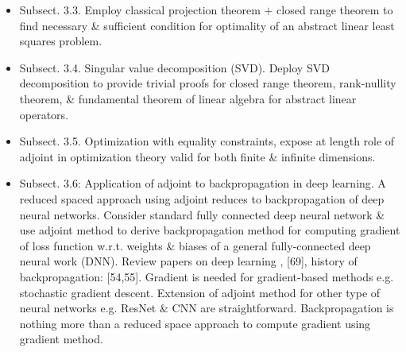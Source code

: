 \documentclass{article}
\newtheorem{proposition}{Proposition}
\newtheorem{theorem}{Theorem}
\begin{document}
\begin{enumerate}
\begin{itemize}
\begin{itemize}
			\begin{proposition}
				Let $A:X\to X$ be a linear operator. Then $A$ has at least 1 eigenvalue.
			\end{proposition}

			\begin{theorem}
				Let $A:X\to X$ be a self-adjoint linear operator. Then, an orthonormal basis of $X$ can be constructed from eigenfunctions of $A$.
			\end{theorem}

			\begin{theorem}[Spectral decomposition of self-adjoint operators in finite dimensions]
				Let $\dim X = n$ \& $A:X\to X$ be a linear \& self-adjoint operator. There exists $n$ real values $\lambda_1\ge\lambda_2\ge\cdots\ge\lambda_n$ \& orthonormal vectors $u_1,u_2,\ldots,u_n$ s.t. $Au_i = \lambda_iu_i$. $\forall x\in X$, $Ax = \sum_{i=1} \lambda_i(x,u_i)_Xu_i\Rightarrow A = \sum_{i=1}^n \lambda_i(\cdot,u_i)_Xu_i$, i.e., $A$ is completely determined by its eigenpairs.
			\end{theorem}

			\item {\sf Subsect. 3.3.} Employ classical projection theorem $+$ closed range theorem to find necessary \& sufficient condition for optimality of an abstract linear least squares problem.

			\item {\sf Subsect. 3.4.} Singular value decomposition (SVD). Deploy SVD decomposition to provide trivial proofs for closed range theorem, rank-nullity theorem, \& fundamental theorem of linear algebra for abstract linear operators.

			\item {\sf Subsect. 3.5.} Optimization with equality constraints, expose at length role of adjoint in optimization theory valid for both finite \& infinite dimensions.

			\item {\sf Subsect. 3.6: Application of adjoint to backpropagation in deep learning.} A reduced spaced approach using adjoint reduces to backpropagation of deep neural networks. Consider standard fully connected deep neural network \& use adjoint method to derive backpropagation method for computing gradient of loss function w.r.t. weights \& biases of a general fully-connected deep neural work (DNN). Review papers on deep learning \cite{LeCun_Bengio_Hinton2015}, [69], history of backpropagation: [54,55]. Gradient is needed for gradient-based methods e.g. stochastic gradient descent. Extension of adjoint method for other type of neural networks e.g. ResNet \& CNN are straightforward. Backpropagation is nothing more than a reduced space approach to compute gradient using gradient method.


\end{itemize}
\end{itemize}
\end{enumerate}
\end{document}
